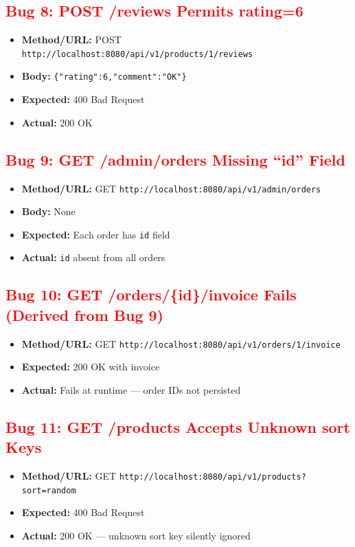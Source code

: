 \documentclass{article}
\begin{document}
\subsection*{\textcolor{red}{Bug 8: POST /reviews Permits rating=6}}
\begin{itemize}[noitemsep]
  \item \textbf{Method/URL:} POST \texttt{http://localhost:8080/api/v1/products/1/reviews}
  \item \textbf{Body:} \texttt{\{"rating":6,"comment":"OK"\}}
  \item \textbf{Expected:} 400 Bad Request
  \item \textbf{Actual:} 200 OK
\end{itemize}

\subsection*{\textcolor{red}{Bug 9: GET /admin/orders Missing ``id'' Field}}
\begin{itemize}[noitemsep]
  \item \textbf{Method/URL:} GET \texttt{http://localhost:8080/api/v1/admin/orders}
  \item \textbf{Body:} None
  \item \textbf{Expected:} Each order has \texttt{id} field
  \item \textbf{Actual:} \texttt{id} absent from all orders
\end{itemize}

\subsection*{\textcolor{red}{Bug 10: GET /orders/\{id\}/invoice Fails (Derived from Bug 9)}}
\begin{itemize}[noitemsep]
  \item \textbf{Method/URL:} GET \texttt{http://localhost:8080/api/v1/orders/1/invoice}
  \item \textbf{Expected:} 200 OK with invoice
  \item \textbf{Actual:} Fails at runtime — order IDs not persisted
\end{itemize}

\subsection*{\textcolor{red}{Bug 11: GET /products Accepts Unknown sort Keys}}
\begin{itemize}[noitemsep]
  \item \textbf{Method/URL:} GET \texttt{http://localhost:8080/api/v1/products?sort=random}
  \item \textbf{Expected:} 400 Bad Request
  \item \textbf{Actual:} 200 OK — unknown sort key silently ignored
\end{itemize}
\end{document}
